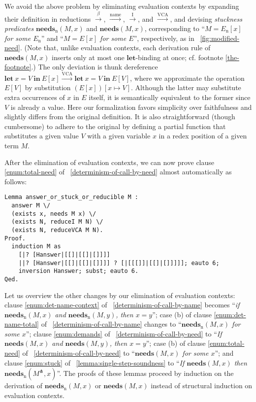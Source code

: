 \documentclass{llncs}
\newcommand{\LET}[3]{\mathbf{let}~#1=#2~\mathbf{in}~#3}
\newcommand{\EXPANDLET}[1]{#1^\pitchfork}
\newcommand{\FULLBETA}{\xrightarrow{\beta}}
\newcommand{\CALLBYNAME}{\xrightarrow{\mathrm{name}}}
\newcommand{\CALLBYNEEDI}{\xrightarrow{\mathrm{I}}}
\newcommand{\CALLBYNEEDVCA}{\xrightarrow{\mathrm{VCA}}}
\newcommand{\DEMAND}[2]{\mathbf{needs}(#2, #1)}
\newcommand{\STUCK}[2]{\mathbf{needs}_\mathrm{n}(#2, #1)}
\begin{document}
We avoid the above problem by eliminating evaluation contexts by expanding their definition in reductions $\FULLBETA$, $\CALLBYNAME$, $\CALLBYNEEDI$, and $\CALLBYNEEDVCA$, and devising \emph{stuckness predicates} $\STUCK{x}{M}$ and $\DEMAND{x}{M}$, corresponding to ``\emph{$M=E_\mathrm{n}[x]$ for some $E_\mathrm{n}$}'' and ``\emph{$M=E[x]$ for some $E$}'', respectively, as in \figurename~\ref{fig:modified-need}.
(Note that, unlike evaluation contexts, each derivation rule of $\DEMAND{x}{M}$ inserts only at most one $\mathbf{let}$-binding at once; cf. footnote {\ref{the-footnote}}.)
The only deviation is thunk dereference
$\LET{x}{V}{E[x]} \CALLBYNEEDVCA \LET{x}{V}{E[V]}$, where we approximate the operation $E[V]$ by substitution $(E[x])[x\mapsto V]$.  Although the latter may substitute extra occurrences of $x$ in $E$ itself, it is semantically equivalent to the former since $V$ is already a value.
Here our formalization favors simplicity over faithfulness and slightly differs from the original definition.  It is also straightforward (though cumbersome) to adhere to the original by defining a partial function that substitutes a given value $V$ with a given variable $x$ in a redex position of a given term $M$.

After the elimination of evaluation contexts, we can now prove clause \ref{enum:total-need} of \lemmaname~\ref{determinism-of-call-by-need} almost automatically as follows:
\begin{verbatim}
Lemma answer_or_stuck_or_reducible M :
  answer M \/
  (exists x, needs M x) \/
  (exists N, reduceI M N) \/
  (exists N, reduceVCA M N).
Proof.
  induction M as
    [|? [Hanswer|[[]|[[]|[]]]]
    ||? [Hanswer|[[]|[[]|[]]]] ? [|[[[]]|[[]|[]]]]]; eauto 6;
    inversion Hanswer; subst; eauto 6.
Qed.
\end{verbatim}

Let us overview the other changes by our elimination of evaluation contexts:
clause \ref{enum:det-name-context} of \lemmaname~\ref{determinism-of-call-by-name} becomes ``\emph{if $\STUCK{x}{M}$ and $\STUCK{y}{M}$, then $x=y$}'';
case
(b) %
of clause \ref{enum:det-name-total} of \lemmaname~\ref{determinism-of-call-by-name} changes to ``\emph{$\STUCK{x}{M}$ for some $x$}'';
clause \ref{enum:demands} of \lemmaname~\ref{determinism-of-call-by-need} to ``\emph{If $\DEMAND{x}{M}$ and $\DEMAND{y}{M}$, then $x=y$}'';
case
(b) %
of clause \ref{enum:total-need} of \lemmaname~\ref{determinism-of-call-by-need} to ``\emph{$\DEMAND{x}{M}$ for some $x$}'';
and clause \ref{enum:stuck} of \lemmaname~\ref{lemma:single-step-soundness} to ``\emph{If $\DEMAND{x}{M}$ then $\STUCK{x}{\EXPANDLET{M}}$}''.
The proofs of these lemmas proceed by induction on the derivation of $\STUCK{x}{M}$ or $\DEMAND{x}{M}$ instead of structural induction on evaluation contexts.
\end{document}

